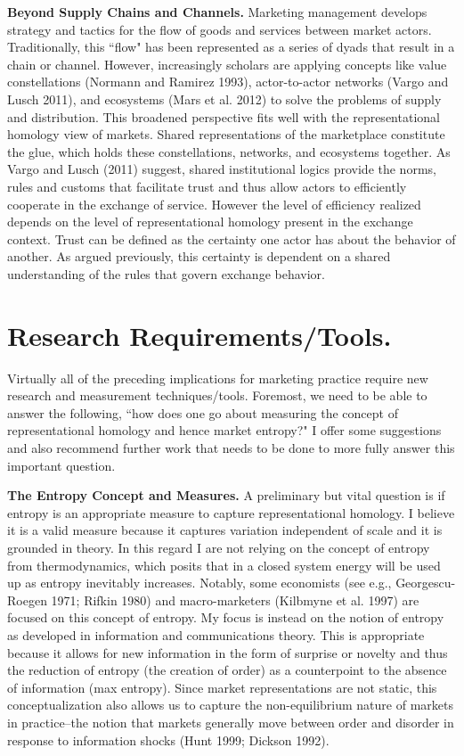 \textbf{Beyond Supply Chains and Channels.}
Marketing management develops strategy and tactics for the flow of goods and services between market actors. Traditionally, this ``flow" has been represented as a series of dyads that result in a chain or channel. However, increasingly scholars are applying concepts like value constellations (Normann and Ramirez 1993), actor-to-actor networks (Vargo and Lusch 2011), and ecosystems (Mars et al. 2012) to solve the problems of supply and distribution. This broadened perspective fits well with the representational homology view of markets. Shared representations of the marketplace constitute the glue, which holds these constellations, networks, and ecosystems together. As Vargo and Lusch (2011) suggest, shared institutional logics provide the norms, rules and customs that facilitate trust and thus allow actors to efficiently cooperate in the exchange of service. However the level of efficiency realized depends on the level of representational homology present in the exchange context. Trust can be defined as the certainty one actor has about the behavior of another. As argued previously, this certainty is dependent on a shared understanding of the rules that govern exchange behavior. 

\section{Research Requirements/Tools.}
Virtually all of the preceding implications for marketing practice require new research and measurement techniques/tools. Foremost, we need to be able to answer the following, ``how does one go about measuring the concept of representational homology and hence market entropy?" I offer some suggestions and also recommend further work that needs to be done to more fully answer this important question. 

\textbf{The Entropy Concept and Measures.}
A preliminary but vital question is if entropy is an appropriate measure to capture representational homology. I believe it is a valid measure because it captures variation independent of scale and it is grounded in theory. In this regard I are not relying on the concept of entropy from thermodynamics, which posits that in a closed system energy will be used up as entropy inevitably increases. Notably, some economists (see e.g., Georgescu-Roegen 1971; Rifkin 1980) and macro-marketers (Kilbmyne et al. 1997) are focused on this concept of entropy. My focus is instead on the notion of entropy as developed in information and communications theory. This is appropriate because it allows for new information in the form of surprise or novelty and thus the reduction of entropy (the creation of order) as a counterpoint to the absence of information (max entropy). Since market representations are not static, this conceptualization also allows us to capture the non-equilibrium nature of markets in practice--the notion that markets generally move between order and disorder in response to information shocks (Hunt 1999; Dickson 1992). 

